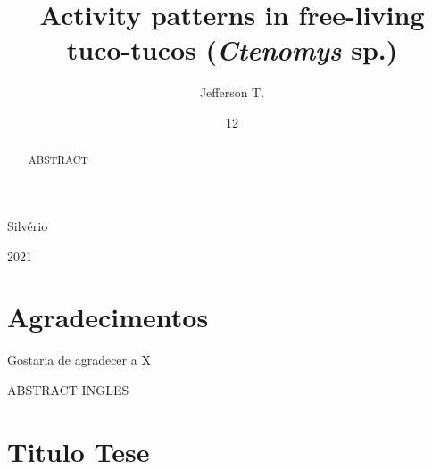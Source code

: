 \documentclass[msc,numbers,hidelinks]{coppe}
\begin{document}
  \title{Activity patterns in free-living tuco-tucos (\emph{Ctenomys} sp.)}
    \author{Jefferson T.}{Silvério}
  

  \date{12}{2021}
    
  \maketitle

  \frontmatter
  
  \dedication{``O sol afundou mais um pouco. As sombras se alongaram, atravessando a caldeira de sal. Linhas de cores vibrantes espalharam-se sobre o horizonte do poente. A cor foi se transformando num dedo de trevas a experimentar a areia. As sombras cor de carvão se alastraram, e o desmoronamento compacto da noite obliterou o deserto.'' \linebreak \textnormal{— Frank Herbert, Duna.}}
  
    \chapter*{Agradecimentos}
  Gostaria de agradecer a X
  
  \begin{abstract}
  ABSTRACT
  \end{abstract}
  \pagebreak
  \begin{foreignabstract}
  ABSTRACT INGLES
  \end{foreignabstract}
  \tableofcontents
  
  
  
  \printlosymbols
  \printloabbreviations

  \mainmatter
  \hypertarget{titulo-tese}{%
  \chapter{Titulo Tese}\label{titulo-tese}}
\end{document}
